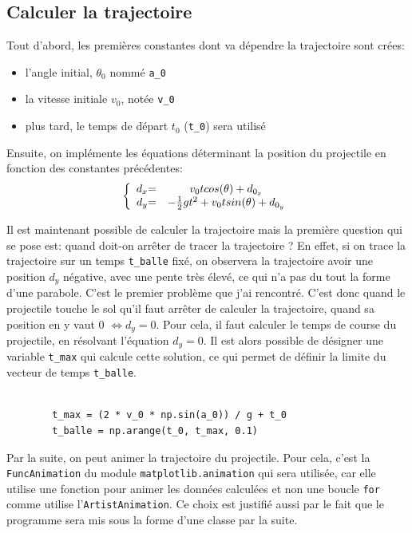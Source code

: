 \documentclass[a4paper,11pt]{article}
\begin{document}
\subsection{Calculer la trajectoire}
Tout d'abord, les premières constantes dont va dépendre la trajectoire sont crées:
\begin{itemize}
	\item l'angle initial, $\theta_0$ nommé \verb|a_0|
	\item la vitesse initiale $v_0$, notée \verb|v_0|
	\item plus tard, le temps de départ $t_0$ (\verb|t_0|) sera utilisé
\end{itemize}
Ensuite, on implémente les équations déterminant la position du projectile en fonction des constantes précédentes:
\[ \left \{
\begin{array}{c @{= \quad} c}
	d_x & v_0 t cos (\theta) + d_{0_x}\\
	d_y &- \frac{1}{2} g t^2 + v_0 t sin(\theta) + d_{0_y}
\end{array}
\right. \]

Il est maintenant possible de calculer la trajectoire mais la première question qui se pose est: quand doit-on arrêter de tracer la trajectoire ? En effet, si on trace la trajectoire sur un temps \verb|t_balle| fixé, on observera la trajectoire avoir une position $d_y$ négative, avec une pente très élevé, ce qui n'a pas du tout la forme d'une parabole. C'est le premier problème que j'ai rencontré. C'est donc quand le projectile touche le sol qu'il faut arrêter de calculer la trajectoire, quand sa position en y vaut 0 $\Leftrightarrow d_y = 0$. Pour cela, il faut calculer le temps de course du projectile, en résolvant l'équation $d_y = 0$. Il est alors possible de désigner une variable \verb|t_max| qui calcule cette solution, ce qui permet de définir la limite du vecteur de temps \verb|t_balle|.
	\begin{verbatim}
	
		t_max = (2 * v_0 * np.sin(a_0)) / g + t_0   
		t_balle = np.arange(t_0, t_max, 0.1)
	\end{verbatim}

Par la suite, on peut animer la trajectoire du projectile. Pour cela, c'est la \verb|FuncAnimation| du module \verb|matplotlib.animation| qui sera utilisée, car elle utilise une fonction pour animer les données calculées et non une boucle \verb|for| comme utilise l'\verb|ArtistAnimation|. Ce choix est justifié aussi par le fait que le programme sera mis sous la forme d'une classe par la suite. 
\end{document}
